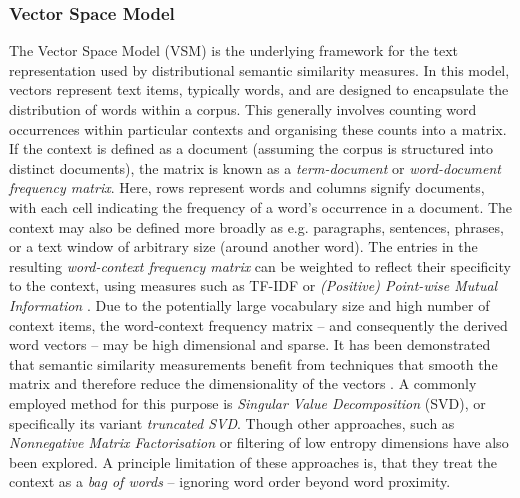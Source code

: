 \documentclass[11pt]{scrreprt}
\let\cite\parencite  %
\begin{document}
\subsubsection{Vector Space Model}
The Vector Space Model (VSM) \cite{turneyFrequencyMeaningVector2010} is the underlying framework for the text representation used by distributional semantic similarity measures. In this model, vectors represent text items, typically words, and are designed to encapsulate the distribution of words within a corpus. This generally involves counting word occurrences within particular contexts and organising these counts into a matrix. If the context is defined as a document (assuming the corpus is structured into distinct documents), the matrix is known as a \textit{term-document} or \textit{word-document frequency matrix}. Here, rows represent words and columns signify documents, with each cell indicating the frequency of a word's occurrence in a document. The context may also be defined more broadly as e.g. paragraphs, sentences, phrases, or a text window of arbitrary size (around another word). The entries in the resulting \textit{word-context frequency matrix} can be weighted to reflect their specificity to the context, using measures such as TF-IDF or \textit{(Positive) Point-wise Mutual Information} \cite{churchWordAssociationNorms1989, niwaCoOccurrenceVectorsCorpora1994}. Due to the potentially large vocabulary size and high number of context items, the word-context frequency matrix -- and consequently the derived word vectors -- may be high dimensional and sparse. It has been demonstrated that semantic similarity measurements benefit from techniques that smooth the matrix and therefore reduce the dimensionality of the vectors \cite{deerwesterIndexingLatentSemantic1990}. A commonly employed method for this purpose is \textit{Singular Value Decomposition} (SVD), or specifically its variant \textit{truncated SVD}. Though other approaches, such as \textit{Nonnegative Matrix Factorisation} \cite{leeLearningPartsObjects1999} or filtering of low entropy dimensions \cite{lundProducingHighdimensionalSemantic1996} have also been explored. A principle limitation of these approaches is, that they treat the context as a \textit{bag of words} -- ignoring word order beyond word proximity.
\end{document}
